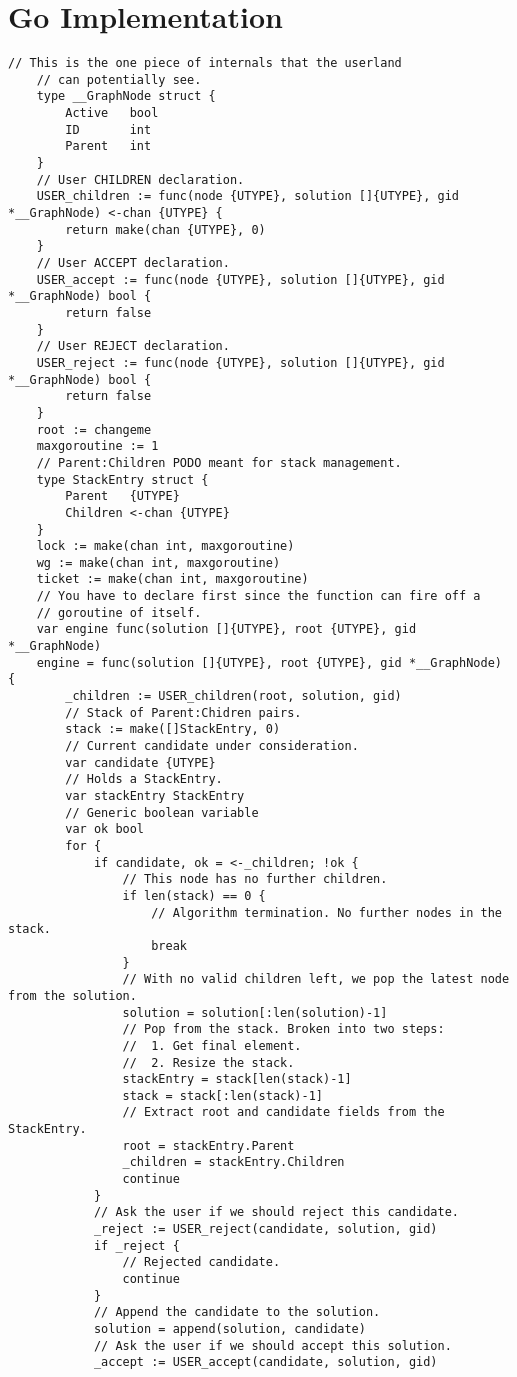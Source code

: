 \documentclass[runningheads]{llncs}
\begin{document}
\section{Go Implementation}
\begin{lstlisting}[language=Golang, style=boxed]
// This is the one piece of internals that the userland
	// can potentially see.
	type __GraphNode struct {
		Active	 bool
		ID       int
		Parent   int
	}
	// User CHILDREN declaration.
	USER_children := func(node {UTYPE}, solution []{UTYPE}, gid *__GraphNode) <-chan {UTYPE} {
		return make(chan {UTYPE}, 0)
	}
	// User ACCEPT declaration.
	USER_accept := func(node {UTYPE}, solution []{UTYPE}, gid *__GraphNode) bool {
		return false
	}
	// User REJECT declaration.
	USER_reject := func(node {UTYPE}, solution []{UTYPE}, gid *__GraphNode) bool {
		return false
	}
	root := changeme
	maxgoroutine := 1
	// Parent:Children PODO meant for stack management.
	type StackEntry struct {
		Parent   {UTYPE}
		Children <-chan {UTYPE}
	}
	lock := make(chan int, maxgoroutine)
	wg := make(chan int, maxgoroutine)
	ticket := make(chan int, maxgoroutine)
	// You have to declare first since the function can fire off a
	// goroutine of itself.
	var engine func(solution []{UTYPE}, root {UTYPE}, gid *__GraphNode)
	engine = func(solution []{UTYPE}, root {UTYPE}, gid *__GraphNode) {
		_children := USER_children(root, solution, gid)
		// Stack of Parent:Chidren pairs.
		stack := make([]StackEntry, 0)
		// Current candidate under consideration.
		var candidate {UTYPE}
		// Holds a StackEntry.
		var stackEntry StackEntry
		// Generic boolean variable
		var ok bool
		for {
			if candidate, ok = <-_children; !ok {
				// This node has no further children.
				if len(stack) == 0 {
					// Algorithm termination. No further nodes in the stack.
					break
				}
				// With no valid children left, we pop the latest node from the solution.
				solution = solution[:len(solution)-1]
				// Pop from the stack. Broken into two steps:
				// 	1. Get final element.
				//	2. Resize the stack.
				stackEntry = stack[len(stack)-1]
				stack = stack[:len(stack)-1]
				// Extract root and candidate fields from the StackEntry.
				root = stackEntry.Parent
				_children = stackEntry.Children
				continue
			}
			// Ask the user if we should reject this candidate.
			_reject := USER_reject(candidate, solution, gid)
			if _reject {
				// Rejected candidate.
				continue
			}
			// Append the candidate to the solution.
			solution = append(solution, candidate)
			// Ask the user if we should accept this solution.
			_accept := USER_accept(candidate, solution, gid)

\end{lstlisting}
\end{document}
